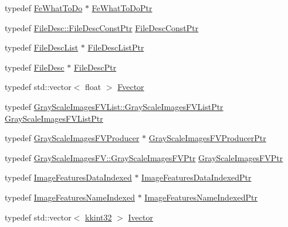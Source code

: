 \begin{DoxyCompactItemize}
typedef \hyperlink{namespace_k_k_m_l_l_aa7a52865d78241e93b30731e46f99b43}{Fe\+What\+To\+Do} $\ast$ \hyperlink{namespace_k_k_m_l_l_a854b1f772a2399657c139db26f252b0f}{Fe\+What\+To\+Do\+Ptr}
\item 
typedef \hyperlink{class_k_k_m_l_l_1_1_file_desc_a4e1a7521c151f58c438413a5be02ae2a}{File\+Desc\+::\+File\+Desc\+Const\+Ptr} \hyperlink{namespace_k_k_m_l_l_a7aa258340f9147d1b257c8eb81450e80}{File\+Desc\+Const\+Ptr}
\item 
typedef \hyperlink{class_k_k_m_l_l_1_1_file_desc_list}{File\+Desc\+List} $\ast$ \hyperlink{namespace_k_k_m_l_l_a192445fd15bc29cfd6713538ef9cf794}{File\+Desc\+List\+Ptr}
\item 
typedef \hyperlink{class_k_k_m_l_l_1_1_file_desc}{File\+Desc} $\ast$ \hyperlink{namespace_k_k_m_l_l_aa0d0b6ab4ec18868a399b8455b05d914}{File\+Desc\+Ptr}
\item 
typedef std\+::vector$<$ float $>$ \hyperlink{namespace_k_k_m_l_l_a4b8b8beb7bc5b2e041c985d12acec0e7}{Fvector}
\item 
typedef \hyperlink{class_k_k_m_l_l_1_1_gray_scale_images_f_v_list_adf1c0ec2049ac8cb8689dc30f8f78ac3}{Gray\+Scale\+Images\+F\+V\+List\+::\+Gray\+Scale\+Images\+F\+V\+List\+Ptr} \hyperlink{namespace_k_k_m_l_l_a4c2724a20eae2c269d0e1284993d7071}{Gray\+Scale\+Images\+F\+V\+List\+Ptr}
\item 
typedef \hyperlink{class_k_k_m_l_l_1_1_gray_scale_images_f_v_producer}{Gray\+Scale\+Images\+F\+V\+Producer} $\ast$ \hyperlink{namespace_k_k_m_l_l_ad2e4f0192f9a3ac0841e33685bd4d5c6}{Gray\+Scale\+Images\+F\+V\+Producer\+Ptr}
\item 
typedef \hyperlink{class_k_k_m_l_l_1_1_gray_scale_images_f_v_af5c112fdba5e66d936a4bb19b14f41a9}{Gray\+Scale\+Images\+F\+V\+::\+Gray\+Scale\+Images\+F\+V\+Ptr} \hyperlink{namespace_k_k_m_l_l_ac3f21d259a7b1893920f27296d70bc6e}{Gray\+Scale\+Images\+F\+V\+Ptr}
\item 
typedef \hyperlink{class_k_k_m_l_l_1_1_image_features_data_indexed}{Image\+Features\+Data\+Indexed} $\ast$ \hyperlink{namespace_k_k_m_l_l_a1da8f4900f46fb371a5df2c25220a788}{Image\+Features\+Data\+Indexed\+Ptr}
\item 
typedef \hyperlink{class_k_k_m_l_l_1_1_image_features_name_indexed}{Image\+Features\+Name\+Indexed} $\ast$ \hyperlink{namespace_k_k_m_l_l_a909776639f71cf2177af45e53ddc724a}{Image\+Features\+Name\+Indexed\+Ptr}
\item 
typedef std\+::vector$<$ \hyperlink{namespace_k_k_b_a8fa4952cc84fda1de4bec1fbdd8d5b1b}{kkint32} $>$ \hyperlink{namespace_k_k_m_l_l_a7dfbe1447876f5f737f0dce1c02ce85c}{Ivector}

\end{DoxyCompactItemize}
